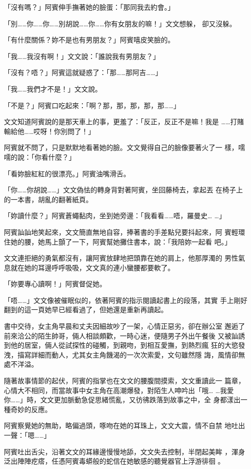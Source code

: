 「沒有嗎？」阿賓伸手撫著她的臉蛋：「那同我去約會。」

「別……你……你……別胡說……你……你有女朋友的嘛！」文文想躲，
卻又沒躲。

「有什麼關係？妳不是也有男朋友？」阿賓嘻皮笑臉的。

「我……我沒有啊！」文文說：「誰說我有男朋友？」

「沒有？唔？」阿賓這就疑惑了：「那……那阿吉……」

「我……我們才不是！」文文說。

「不是？」阿賓口吃起來：「啊？那，那，那，那，那……」

文文知道阿賓說的是那天車上的事，更羞了：「反正，反正不是嘛！我是
……打賭輸給他……哎呀！你別問了！」

阿賓就不問了，只是默默地看著她的臉。文文覺得自己的臉像要著火了一
樣，嚅嚅的說：「你看什麼？」

「看妳臉紅紅的很漂亮。」阿賓油嘴滑舌。

「你……你胡說……」文文偽怯的轉身背對著阿賓，坐回藤椅去，拿起丟
在椅子上的一本書，胡亂的翻著紙頁。

「妳讀什麼？」阿賓蒼蠅黏肉，坐到她旁邊：「我看看……唔，羅曼史…
…」

阿賓訕訕地笑起來，文文簡直無地自容，捧著書的手差點兒要抖起來，阿
賓輕環住她的腰，她馬上顫了一下，阿賓幫她攤住書本，說：「我陪妳一起看
吧。」

文文連拒絕的勇氣都沒有，讓阿賓放肆地把頭靠在她的肩上，他那厚濁的
男性氣息就在她的耳邊呼呼吸吸，文文真的連小蠻腰都要軟了。

「妳要專心讀啊！」阿賓督促她。

「唔……」文文像被催眠似的，依著阿賓的指示閱讀起書上的段落，其實
手上剛好翻到的這一頁她早已經看過了，但她還是重新再讀起。

書中交待，女主角早晨和丈夫因細故吵了一架，心情正惡劣，卻在辦公室
邂逅了前來洽公的陌生帥哥，倆人相談頗歡，一時心迷，便隨男子外出午餐後
又被訕誘到他的居室，倆人從試探性的碰觸，到親吻，到相互愛撫，到熱烈瘋
狂的大慾發洩，描寫詳細而動人，尤其女主角饑渴的一次次索愛，文句雖然隱
誨，風情卻無處不洋溢。

隨著故事情節的起伏，阿賓的指掌也在文文的腰腹間摸索，文文重讀此一
篇章，心情大不相同，而當故事中女主角在高潮爆發，對陌生人呻吟出「哦…
…我愛你……」時，文文更加脈動急促思緒慌亂，又彷彿跌落到故事之中，全
身都漾出一種奇妙的反應。

阿賓察覺她的無助，略偏過頭，啄吻在她的耳珠上，文文大震，情不自禁
地吐出一聲：「嗯……」

阿賓吐出舌尖，沿著文文的耳緣邊慢慢地舔，文文失去控制，半閉起美眸
，渾身泛出陣陣疙瘩，任憑阿賓毒蟒般的蛇信在她敏感的聽覺器官上浮游徘徊
。

